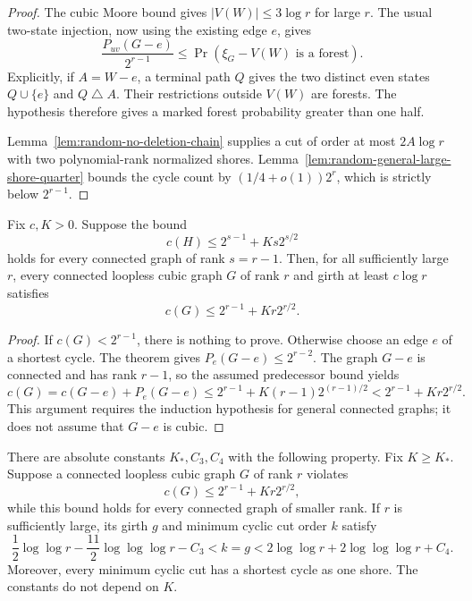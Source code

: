 \begin{proof}
The cubic Moore bound gives $|V(W)|\le3\log r$ for large $r$.
The usual two-state injection, now using the existing edge $e$, gives
\[
 \frac{P_{uv}(G-e)}{2^{r-1}}
 \le\Pr(\xi_G-V(W)\text{ is a forest}).
\]
Explicitly, if $A=W-e$, a terminal path $Q$ gives the two distinct even states
$Q\cup\{e\}$ and $Q\mathbin\triangle A$.
Their restrictions outside $V(W)$ are forests.
The hypothesis therefore gives a marked forest probability greater than one half.

Lemma~\ref{lem:random-no-deletion-chain} supplies a cut of order at most $2A\log r$ with two polynomial-rank normalized shores.
Lemma~\ref{lem:random-general-large-shore-quarter} bounds the cycle count by
$(1/4+o(1))2^r$, which is strictly below $2^{r-1}$.
\end{proof}

\begin{corollary}
\label{cor:random-high-girth-minimal-counterexample}
Fix $c,K>0$.
Suppose the bound
\[
 c(H)\le2^{s-1}+K s2^{s/2}
\]
holds for every connected graph of rank $s=r-1$.
Then, for all sufficiently large $r$, every connected loopless cubic graph $G$ of rank $r$ and girth at least $c\log r$ satisfies
\[
 c(G)\le2^{r-1}+K r2^{r/2}.
\]
\end{corollary}

\begin{proof}
If $c(G)<2^{r-1}$, there is nothing to prove.
Otherwise choose an edge $e$ of a shortest cycle.
The theorem gives $P_e(G-e)\le2^{r-2}$.
The graph $G-e$ is connected and has rank $r-1$, so the assumed predecessor bound yields
\[
 c(G)=c(G-e)+P_e(G-e)
 \le2^{r-1}+K(r-1)2^{(r-1)/2}
 <2^{r-1}+Kr2^{r/2}.
\]
This argument requires the induction hypothesis for general connected graphs; it does not assume that $G-e$ is cubic.
\end{proof}

\begin{corollary}
\label{cor:random-minimal-counterexample-window}
There are absolute constants $K_*,C_3,C_4$ with the following property.
Fix $K\ge K_*$.
Suppose a connected loopless cubic graph $G$ of rank $r$ violates
\[
 c(G)\le2^{r-1}+Kr2^{r/2},
\]
while this bound holds for every connected graph of smaller rank.
If $r$ is sufficiently large, its girth $g$ and minimum cyclic cut order $k$ satisfy
\[
 \frac12\log\log r-\frac{11}{2}\log\log\log r-C_3
 <k=g
 <2\log\log r+2\log\log\log r+C_4.
\]
Moreover, every minimum cyclic cut has a shortest cycle as one shore.
The constants do not depend on $K$.
\end{corollary}

